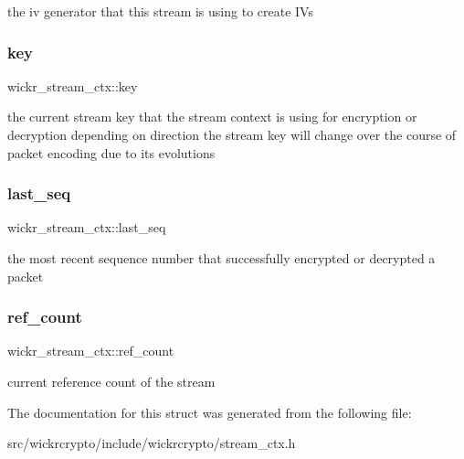 the iv generator that this stream is using to create I\+Vs \mbox{\label{structwickr__stream__ctx_a3598b3c0415d13fafab6633f8c00a3c8}} 
\subsubsection{\texorpdfstring{key}{key}}
{\footnotesize\ttfamily wickr\+\_\+stream\+\_\+ctx\+::key}

the current stream key that the stream context is using for encryption or decryption depending on direction the stream key will change over the course of packet encoding due to it\textquotesingle{}s evolutions \mbox{\label{structwickr__stream__ctx_abf2c6ab54e1663e6a47e310fd68b3b3f}} 
\subsubsection{\texorpdfstring{last\_seq}{last\_seq}}
{\footnotesize\ttfamily wickr\+\_\+stream\+\_\+ctx\+::last\+\_\+seq}

the most recent sequence number that successfully encrypted or decrypted a packet \mbox{\label{structwickr__stream__ctx_aa0e74b2c117666501373a5947d92e8c4}} 
\subsubsection{\texorpdfstring{ref\_count}{ref\_count}}
{\footnotesize\ttfamily wickr\+\_\+stream\+\_\+ctx\+::ref\+\_\+count}

current reference count of the stream 

The documentation for this struct was generated from the following file\+:\begin{DoxyCompactItemize}
\item 
src/wickrcrypto/include/wickrcrypto/stream\+\_\+ctx.\+h\end{DoxyCompactItemize}

